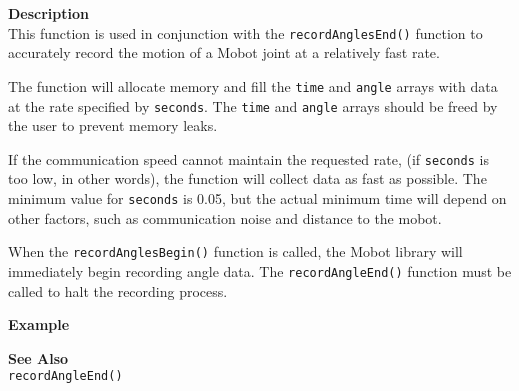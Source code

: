 \noindent
{\bf Description}\\
This function is used in conjunction with the \texttt{recordAnglesEnd()}
function to accurately record the motion of a Mobot joint at a relatively fast
rate. 

The function will allocate memory and fill the \texttt{time} and \texttt{angle} arrays with data
at the rate specified by \texttt{seconds}. The \texttt{time} and \texttt{angle} arrays should
be freed by the user to prevent memory leaks.

If the communication speed cannot maintain 
the requested rate, (if \texttt{seconds} is too low, in other words), the function will
collect data as fast as possible. The minimum value for \texttt{seconds} is 0.05, but
the actual minimum time will depend on other factors, such as communication noise and
distance to the mobot.

When the \texttt{recordAnglesBegin()} function is called, the Mobot library will 
immediately begin recording angle data. The \texttt{recordAngleEnd()} function
must be called to halt the recording process. 

\noindent
{\bf Example}\\
\noindent

\noindent
{\bf See Also}\\
\texttt{recordAngleEnd()} \\
